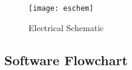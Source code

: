 \begin{figure}[htp]
  \centering
  \texttt{[image: eschem]}
  \caption{Electrical Schematic}
  \label{fig:eschem}
\end{figure}

\subsection{Software Flowchart}

